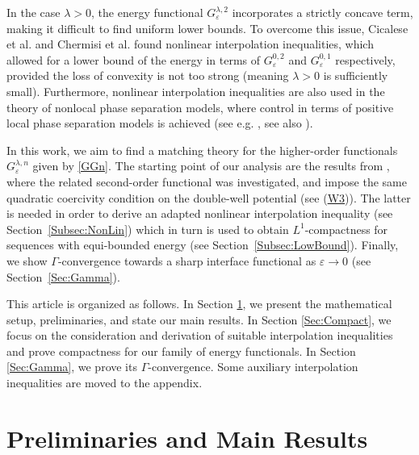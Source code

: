 \documentclass{article}
\newcommand{\lam}{\lambda}
\newcommand{\eps}{\varepsilon}
\numberwithin{figure}{section}
\numberwithin{equation}{section}
\begin{document}
In the case $\lam > 0$, the energy functional $G_\eps^{\lam,2}$ incorporates a strictly concave term, making it difficult to find uniform lower bounds. To overcome this issue, Cicalese et al. \cite{CicSpaZep} and Chermisi et al. \cite{CheDalFonLeo} found nonlinear interpolation inequalities, which allowed for a lower bound of the energy in terms of $G_\eps^{0,2}$ and $G_\eps^{0,1}$ respectively, provided the loss of convexity is not too strong (meaning $\lam > 0$ is sufficiently small). Furthermore, nonlinear interpolation inequalities are also used in the theory of nonlocal phase separation models, where control in terms of positive local phase separation models is achieved (see e.g. \cite{FonHayLeoZwi, GinPesZwi}, see also \cite{Sol}).

In this work, we aim to find a matching theory for the higher-order functionals $G_\eps^{\lam,n}$ given by \eqref{GGn}. The starting point of our analysis are the results from \cite{CicSpaZep}, where the related second-order functional was investigated, and impose the same quadratic coercivity condition on the double-well potential (see {\rm{(\hyperref[it-W3]{W3})}}). The latter is needed in order to derive an adapted nonlinear interpolation inequality (see Section~\ref{Subsec:NonLin}) which in turn is used to obtain $L^1$-compactness for sequences with equi-bounded energy (see Section~\ref{Subsec:LowBound}). Finally, we show $\Gamma$-convergence towards a sharp interface functional as $\eps \to 0$ (see Section~\ref{Sec:Gamma}).

This article is organized as follows. In Section \ref{Sec:Prelim}, we present the mathematical setup, preliminaries, and state our main results. In Section \ref{Sec:Compact}, we focus on the consideration and derivation of suitable interpolation inequalities and prove compactness for our family of energy functionals. In Section \ref{Sec:Gamma}, we prove its $\Gamma$-convergence. Some auxiliary interpolation inequalities are moved to the appendix.



\section{Preliminaries and Main Results} \label{Sec:Prelim}
\end{document}

